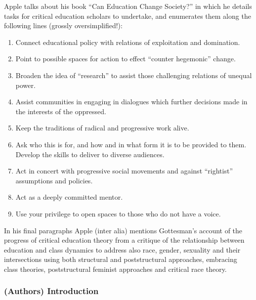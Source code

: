 \documentclass[10pt,titlepage]{book}
\begin{document}
Apple talks about his book ``Can Education Change Society?'' in which he details tasks for critical education scholars to undertake, and enumerates them along the following lines (grossly oversimplified!):

\begin{enumerate}

\item Connect educational policy with relations of exploitation and domination.
  
\item Point to possible spaces for action to effect ``counter hegemonic'' change.
  
\item Broaden the idea of ``research'' to assist those challenging relations of unequal power.
  
\item Assist communities in engaging in dialogues which further decisions made in the interests of the oppressed.
  
\item Keep the traditions of radical and progressive work alive.
  
\item Ask who this is for, and how and in what form it is to be provided to them.
  Develop the skills to deliver to diverse audiences.
  
\item Act in concert with progressive social movements and against ``rightist'' assumptions and policies.
  
\item Act as a deeply committed mentor.

\item Use your privilege to open spaces to those who do not have a voice.
  
\end{enumerate}

In his final paragraphs Apple (inter alia) mentions Gottesman's account of the progress of critical education theory from a critique of the relationship between education and class dynamics to address also race, gender, sexuality and their intersections using both structural and poststructural approaches, embracing class theories, poststructural feminist approaches and critical race theory.

\subsubsection{(Authors) Introduction}
\end{document}
